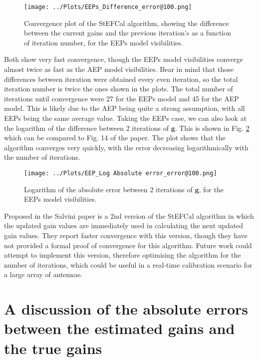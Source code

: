 \documentclass[12pt]{report} %
\begin{document}
\begin{figure}[h]
  \centering
  \texttt{[image: ../Plots/EEPs\_Difference\_error@100.png]}
  \caption{Convergence plot of the StEFCal algorithm, showing the difference between the current gains and the previous iteration's as a function of iteration number, for the EEPs model visibilities.}
  \label{fig:convergence_EEP}
\end{figure}

\newpage
Both show very fast convergence, though the EEPs model visibilities converge almost twice as fast as the AEP model visibilities. Bear in mind that those differences between iteration were obtained every even iteration, so the total iteration number is twice the ones shown in the plots. The total number of iterations until convergence were 27 for the EEPs model and 45 for the AEP model. This is likely due to the AEP being quite a strong assumption, with all EEPs being the same average value. Taking the EEPs case, we can also look at the logarithm of the difference between 2 iterations of $\mathbf{g}$. This is shown in Fig. \ref{fig:log_convergence_EEP} which can be compared to Fig. 14 of the paper\cite{salvini2014fast}. The plot shows that the algorithm converges very quickly, with the error decreasing logarithmically with the number of iterations.


\begin{figure}[h]
  \centering
  \texttt{[image: ../Plots/EEP\_Log Absolute error\_error@100.png]}
  \caption{Logarithm of the absolute error between 2 iterations of $\mathbf{g}$, for the EEPs model visibilities.}
  \label{fig:log_convergence_EEP}
\end{figure}

Proposed in the Salvini paper \cite{salvini2014fast} is a 2nd version of the StEFCal algorithm in which the updated gain values are immediately used in calculating the next updated gain values. They report faster convergence with this version, though they have not provided a formal proof of convergence for this algorithm. Future work could attempt to implement this version, therefore optimising the algorithm for the number of iterations, which could be useful in a real-time calibration scenario for a large array of antennae.

\newpage
\section{A discussion of the absolute errors between the estimated gains and the true gains}
\end{document}
